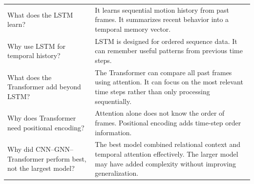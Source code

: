 \documentclass[11pt,a4paper]{article}
\begin{document}
\begin{longtable}{QA}
What does the LSTM learn? &
It learns sequential motion history from past frames. It summarizes recent behavior into a temporal memory vector. \\
\addlinespace
Why use LSTM for temporal history? &
LSTM is designed for ordered sequence data. It can remember useful patterns from previous time steps. \\
\addlinespace
What does the Transformer add beyond LSTM? &
The Transformer can compare all past frames using attention. It can focus on the most relevant time steps rather than only processing sequentially. \\
\addlinespace
Why does Transformer need positional encoding? &
Attention alone does not know the order of frames. Positional encoding adds time-step order information. \\
\addlinespace
Why did CNN--GNN--Transformer perform best, not the largest model? &
The best model combined relational context and temporal attention effectively. The larger model may have added complexity without improving generalization. \\
\bottomrule
\end{longtable}
\end{document}

